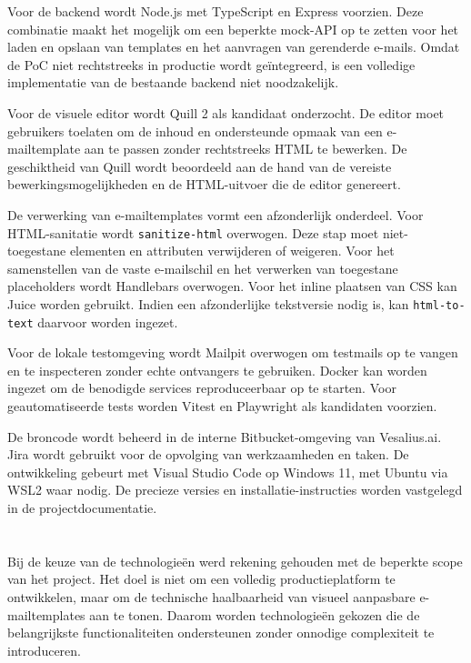 Voor de backend wordt Node.js met TypeScript en Express voorzien.
Deze combinatie maakt het mogelijk om een beperkte mock-API op te zetten
voor het laden en opslaan van templates en het aanvragen van gerenderde
e-mails. Omdat de PoC niet rechtstreeks in productie wordt geïntegreerd,
is een volledige implementatie van de bestaande backend niet noodzakelijk.

Voor de visuele editor wordt Quill 2 als kandidaat onderzocht. De editor
moet gebruikers toelaten om de inhoud en ondersteunde opmaak van een
e-mailtemplate aan te passen zonder rechtstreeks HTML te bewerken.
De geschiktheid van Quill wordt beoordeeld aan de hand van de vereiste
bewerkingsmogelijkheden en de HTML-uitvoer die de editor genereert.

De verwerking van e-mailtemplates vormt een afzonderlijk onderdeel.
Voor HTML-sanitatie wordt \texttt{sanitize-html} overwogen. Deze stap moet
niet-toegestane elementen en attributen verwijderen of weigeren. Voor het
samenstellen van de vaste e-mailschil en het verwerken van toegestane
placeholders wordt Handlebars overwogen. Voor het inline plaatsen van CSS
kan Juice worden gebruikt. Indien een afzonderlijke tekstversie nodig is,
kan \texttt{html-to-text} daarvoor worden ingezet.

Voor de lokale testomgeving wordt Mailpit overwogen om testmails op te
vangen en te inspecteren zonder echte ontvangers te gebruiken. Docker kan
worden ingezet om de benodigde services reproduceerbaar op te starten.
Voor geautomatiseerde tests worden Vitest en Playwright als kandidaten
voorzien.

De broncode wordt beheerd in de interne Bitbucket-omgeving van Vesalius.ai.
Jira wordt gebruikt voor de opvolging van werkzaamheden en taken. De
ontwikkeling gebeurt met Visual Studio Code op Windows 11, met Ubuntu
via WSL2 waar nodig. De precieze versies en installatie-instructies worden
vastgelegd in de projectdocumentatie.

\section{}%
\label{sec:vergelijking}
Bij de keuze van de technologieën werd rekening gehouden met de beperkte
scope van het project. Het doel is niet om een volledig productieplatform
te ontwikkelen, maar om de technische haalbaarheid van visueel aanpasbare
e-mailtemplates aan te tonen. Daarom worden technologieën gekozen die de
belangrijkste functionaliteiten ondersteunen zonder onnodige complexiteit
te introduceren.

